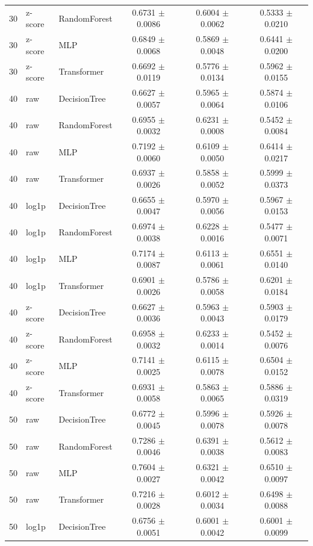 \begin{longtable}{rllccc}
30 & z-score & RandomForest & 0.6731 $\pm$ 0.0086 & 0.6004 $\pm$ 0.0062 & 0.5333 $\pm$ 0.0210 \\
30 & z-score & MLP & 0.6849 $\pm$ 0.0068 & 0.5869 $\pm$ 0.0048 & 0.6441 $\pm$ 0.0200 \\
30 & z-score & Transformer & 0.6692 $\pm$ 0.0119 & 0.5776 $\pm$ 0.0134 & 0.5962 $\pm$ 0.0155 \\
40 & raw & DecisionTree & 0.6627 $\pm$ 0.0057 & 0.5965 $\pm$ 0.0064 & 0.5874 $\pm$ 0.0106 \\
40 & raw & RandomForest & 0.6955 $\pm$ 0.0032 & 0.6231 $\pm$ 0.0008 & 0.5452 $\pm$ 0.0084 \\
40 & raw & MLP & 0.7192 $\pm$ 0.0060 & 0.6109 $\pm$ 0.0050 & 0.6414 $\pm$ 0.0217 \\
40 & raw & Transformer & 0.6937 $\pm$ 0.0026 & 0.5858 $\pm$ 0.0052 & 0.5999 $\pm$ 0.0373 \\
40 & log1p & DecisionTree & 0.6655 $\pm$ 0.0047 & 0.5970 $\pm$ 0.0056 & 0.5967 $\pm$ 0.0153 \\
40 & log1p & RandomForest & 0.6974 $\pm$ 0.0038 & 0.6228 $\pm$ 0.0016 & 0.5477 $\pm$ 0.0071 \\
40 & log1p & MLP & 0.7174 $\pm$ 0.0087 & 0.6113 $\pm$ 0.0061 & 0.6551 $\pm$ 0.0140 \\
40 & log1p & Transformer & 0.6901 $\pm$ 0.0026 & 0.5786 $\pm$ 0.0058 & 0.6201 $\pm$ 0.0184 \\
40 & z-score & DecisionTree & 0.6627 $\pm$ 0.0036 & 0.5963 $\pm$ 0.0043 & 0.5903 $\pm$ 0.0179 \\
40 & z-score & RandomForest & 0.6958 $\pm$ 0.0032 & 0.6233 $\pm$ 0.0014 & 0.5452 $\pm$ 0.0076 \\
40 & z-score & MLP & 0.7141 $\pm$ 0.0025 & 0.6115 $\pm$ 0.0078 & 0.6504 $\pm$ 0.0152 \\
40 & z-score & Transformer & 0.6931 $\pm$ 0.0058 & 0.5863 $\pm$ 0.0065 & 0.5886 $\pm$ 0.0319 \\
50 & raw & DecisionTree & 0.6772 $\pm$ 0.0045 & 0.5996 $\pm$ 0.0078 & 0.5926 $\pm$ 0.0078 \\
50 & raw & RandomForest & 0.7286 $\pm$ 0.0046 & 0.6391 $\pm$ 0.0038 & 0.5612 $\pm$ 0.0083 \\
50 & raw & MLP & 0.7604 $\pm$ 0.0027 & 0.6321 $\pm$ 0.0042 & 0.6510 $\pm$ 0.0097 \\
50 & raw & Transformer & 0.7216 $\pm$ 0.0028 & 0.6012 $\pm$ 0.0034 & 0.6498 $\pm$ 0.0088 \\
50 & log1p & DecisionTree & 0.6756 $\pm$ 0.0051 & 0.6001 $\pm$ 0.0042 & 0.6001 $\pm$ 0.0099 \\

\end{longtable}
